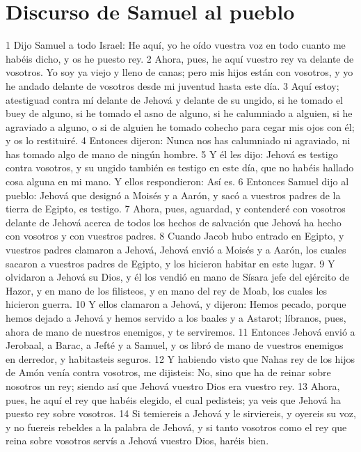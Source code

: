 \section*{Discurso de Samuel al pueblo}

1 Dijo Samuel a todo Israel: He aquí, yo he oído vuestra voz en todo cuanto me habéis dicho, y os he puesto rey.
2 Ahora, pues, he aquí vuestro rey va delante de vosotros. Yo soy ya viejo y lleno de canas; pero mis hijos están con vosotros, y yo he andado delante de vosotros desde mi juventud hasta este día.
3 Aquí estoy; atestiguad contra mí delante de Jehová y delante de su ungido, si he tomado el buey de alguno, si he tomado el asno de alguno, si he calumniado a alguien, si he agraviado a alguno, o si de alguien he tomado cohecho para cegar mis ojos con él; y os lo restituiré.
4 Entonces dijeron: Nunca nos has calumniado ni agraviado, ni has tomado algo de mano de ningún hombre.
5 Y él les dijo: Jehová es testigo contra vosotros, y su ungido también es testigo en este día, que no habéis hallado cosa alguna en mi mano. Y ellos respondieron: Así es.
6 Entonces Samuel dijo al pueblo: Jehová que designó a Moisés y a Aarón, y sacó a vuestros padres de la tierra de Egipto, es testigo.
7 Ahora, pues, aguardad, y contenderé con vosotros delante de Jehová acerca de todos los hechos de salvación que Jehová ha hecho con vosotros y con vuestros padres.
8 Cuando Jacob hubo entrado en Egipto, y vuestros padres clamaron a Jehová, Jehová envió a Moisés y a Aarón, los cuales sacaron a vuestros padres de Egipto, y los hicieron habitar en este lugar.
9 Y olvidaron a Jehová su Dios, y él los vendió en mano de Sísara jefe del ejército de Hazor, y en mano de los filisteos, y en mano del rey de Moab, los cuales les hicieron guerra.
10 Y ellos clamaron a Jehová, y dijeron: Hemos pecado, porque hemos dejado a Jehová y hemos servido a los baales y a Astarot; líbranos, pues, ahora de mano de nuestros enemigos, y te serviremos. 
11 Entonces Jehová envió a Jerobaal, a Barac, a Jefté y a Samuel, y os libró de mano de vuestros enemigos en derredor, y habitasteis seguros.
12 Y habiendo visto que Nahas rey de los hijos de Amón venía contra vosotros, me dijisteis: No, sino que ha de reinar sobre nosotros un rey; siendo así que Jehová vuestro Dios era vuestro rey.
13 Ahora, pues, he aquí el rey que habéis elegido, el cual pedisteis; ya veis que Jehová ha puesto rey sobre vosotros.
14 Si temiereis a Jehová y le sirviereis, y oyereis su voz, y no fuereis rebeldes a la palabra de Jehová, y si tanto vosotros como el rey que reina sobre vosotros servís a Jehová vuestro Dios, haréis bien.
